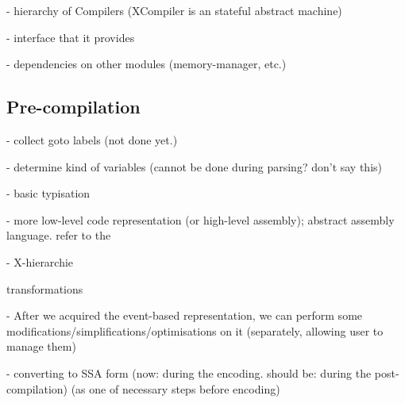 





- hierarchy of Compilers (XCompiler is an stateful abstract machine)

- interface that it provides

- dependencies on other modules (memory-manager, etc.)


\subsection{Pre-compilation}
\label{ch:impl:y2x:precomp}

- collect goto labels (not done yet.)

- determine kind of variables (cannot be done during parsing? don't say this)

- basic typisation



- more low-level code representation (or high-level assembly); abstract assembly language. refer to the %

- X-hierarchie



transformations

- After we acquired the event-based representation, we can perform some modifications/simplifications/optimisations on it (separately, allowing user to manage them)

- converting to SSA form (now: during the encoding. should be: during the post-compilation) (as one of necessary steps before encoding)

